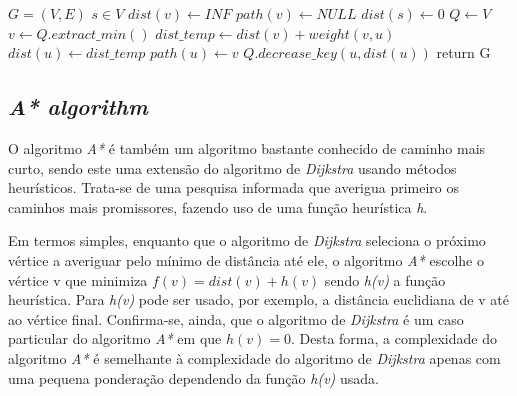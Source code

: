 \documentclass[12pt,a4paper]{report}
\begin{document}
		\begin{center}
			\begin{algorithmic}[1]
				\State $G = (V, E)$
				\State $s \in V$
				\newline
				\Comment{using a priority queue}
				\For{$v \in V$}
					\State $dist(v) \leftarrow INF$
					\State $path(v) \leftarrow NULL$
				\EndFor
				\State $dist(s) \leftarrow 0$
				\State $Q \leftarrow V$
					\State $v \leftarrow Q.extract\_min()$
						\State $dist\_temp \leftarrow dist(v) + weight(v,u)$
							\State $dist(u) \leftarrow dist\_temp$
							\State $path(u) \leftarrow v$
							\State $Q.decrease\_key(u,dist(u))$
						\EndIf
					\EndFor
				\EndWhile
				\State return G
				\EndFunction
			\end{algorithmic}
		\end{center}


		\subsection{\textit{A* algorithm}}
		O algoritmo \textit{A*} \cite{astar} é também um algoritmo bastante conhecido de caminho mais curto, sendo este uma extensão do algoritmo de \textit{Dijkstra} usando métodos heurísticos. Trata-se de uma pesquisa informada que averigua primeiro os caminhos mais promissores, fazendo uso de uma função heurística \textit{h}. \par
		Em termos simples, enquanto que o algoritmo de \textit{Dijkstra} seleciona o próximo vértice a averiguar pelo mínimo de distância até ele, o algoritmo \textit{A*} escolhe o vértice v que minimiza \(f(v) = dist(v) + h(v)\) sendo \textit{h(v)} a função heurística. Para \textit{h(v)} pode ser usado, por exemplo, a distância euclidiana de v até ao vértice final. Confirma-se, ainda, que o algoritmo de \textit{Dijkstra} é um caso particular do algoritmo \textit{A*} em que \( h(v) = 0 \). Desta forma, a complexidade do algoritmo \textit{A*} é semelhante à complexidade do algoritmo de \textit{Dijkstra} apenas com uma pequena ponderação dependendo da função \textit{h(v)} usada.
\end{document}
